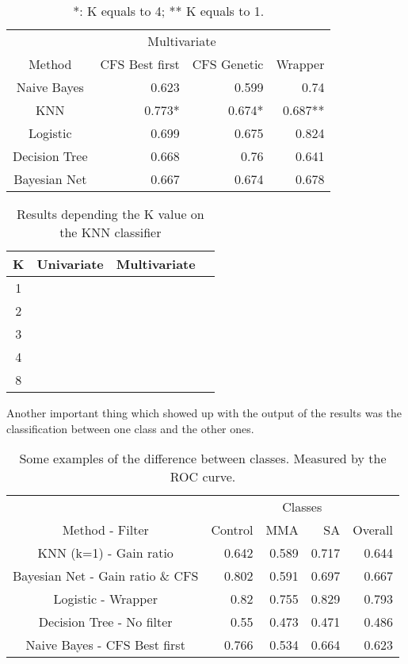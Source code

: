 \documentclass[conference,a4paper]{IEEEtran}
\begin{document}
\begin{table}[h]
	\caption{*: K equals to 4; ** K equals to 1.}
	\centering
	\begin{tabular}{c r r r}
		\hline\hline
		& \multicolumn{2}{c}{Multivariate} & \\
		Method & CFS Best first & CFS Genetic & Wrapper\\ [0.2ex]
		\hline
		Naive Bayes & 0.623 & 0.599 & 0.74 \\
		KNN & 0.773* & 0.674* & 0.687** \\
		Logistic & 0.699 & 0.675 & 0.824 \\
		Decision Tree & 0.668 & 0.76 & 0.641 \\
		Bayesian Net & 0.667 & 0.674 & 0.678 \\ [1ex]
		\hline
	\end{tabular}
	\label{table:filteredResults}
\end{table}

\begin{table}[h]
	\caption{Results depending the K value on the KNN classifier}
	\centering
	\begin{tabular}{c r r r}
		\hline\hline
		K & Univariate & Multivariate\\ [0.2ex]
		\hline
		1 & \\
		2 & \\
		3 & \\
		4 & \\
		8 &  \\ [1ex]
		\hline
	\end{tabular}
	\label{table:knnResults}
\end{table}


Another important thing which showed up with the output of the results was the classification between one class and the other ones.

\begin{table}[h]
	\caption{Some examples of the difference between classes. Measured by the ROC curve.}
	\centering
	\begin{tabular}{c r r r r}
		\hline\hline
		& \multicolumn{4}{c}{Classes} \\
		Method - Filter & Control & MMA & SA & Overall\\ [0.2ex]
		\hline 
		KNN (k=1) - Gain ratio & 0.642 & 0.589 & 0.717 & 0.644 \\
		Bayesian Net - Gain ratio \& CFS & 0.802 & 0.591 & 0.697 & 0.667 \\
		Logistic - Wrapper & 0.82 & 0.755 & 0.829 & 0.793 \\
		Decision Tree - No filter & 0.55 & 0.473 & 0.471 & 0.486\\
		Naive Bayes - CFS Best first & 0.766 & 0.534 & 0.664 & 0.623 \\ [1ex]
		\hline
	\end{tabular}
	\label{table:inClassResults}
\end{table}
\end{document}
